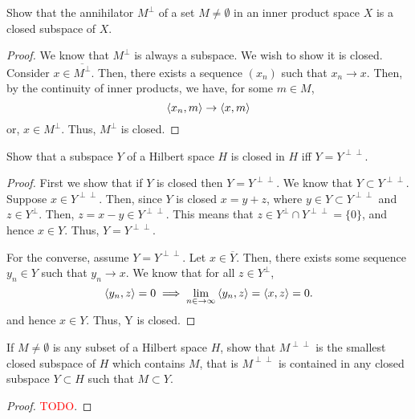 \begin{question}
   Show that the annihilator $M^\perp$ of a set $M \neq \emptyset$ in an inner product space $X$ is a closed subspace of $X$.
    \label{section3.3-8}
\end{question}
\begin{proof}
    We know that $M^\perp$ is always a subspace. We wish to show it is closed. Consider $x \in \overline{M^\perp}$. Then, there exists a sequence $(x_n)$ such that $x_n \rightarrow x$. Then, by the continuity of inner products, we have, for some $m \in M$, 
    \[\left\langle x_n , m \right\rangle \rightarrow \left\langle x , m \right\rangle\]
    or, $x \in M^\perp$. Thus, $M^\perp$ is closed.
\end{proof}

\begin{question}
   Show that a subspace $Y$ of a Hilbert space $H$ is closed in $H$ iff $Y = Y^{\perp\perp}$.
    \label{section3.3-9}
\end{question}
\begin{proof}
    First we show that if $Y$ is closed then $Y = Y^ {\perp\perp}$. We know that $Y \subset Y^{\perp\perp}$. Suppose $x \in Y^{\perp\perp}$. Then, since $Y$ is closed $x = y + z$, where $y \in Y \subset Y^{\perp\perp}$ and $z \in Y^{\perp}$. Then, $z = x - y \in Y^{\perp\perp}$. This means that $z \in Y^{\perp} \cap Y^{\perp\perp} = \{0\}$, and hence $x \in Y$. Thus, $Y = Y^{\perp\perp}$.

    For the converse, assume $Y = Y^{\perp\perp}$. Let $x \in \overline{Y}$. Then, there exists some sequence $y_n \in Y$ such that $y_n \rightarrow x$. We know that for all $z \in Y^{\perp}$, 
    \[\left\langle y_n , z \right\rangle = 0 \implies \lim_{n \in \rightarrow \infty} \left\langle y_n , z \right\rangle = \left\langle x , z \right\rangle = 0.\]
    and hence $x \in Y$. Thus, Y is closed.
    
\end{proof}

\begin{question}
    If $M \neq \emptyset$ is any subset of a Hilbert space $H$, show that $M^{\perp\perp}$ is the smallest closed subspace of $H$ which contains $M$, that is $M^{\perp\perp}$ is contained in any closed subspace $Y \subset H$ such that $M \subset Y$.
    \label{section3.3-10}
\end{question}
\begin{proof}
    \textcolor{red}{TODO}.
    
\end{proof}